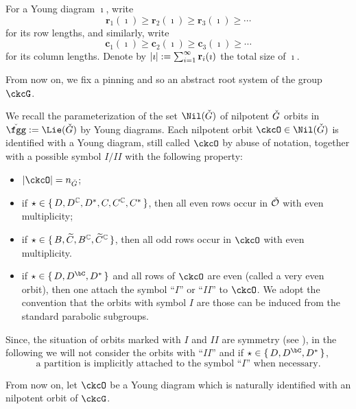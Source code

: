 \documentclass[counting_main.tex]{subfiles}
\begin{document}
For a Young diagram $\imath$, write
\[
  \mathbf r_1(\imath)\geq \mathbf r_2(\imath)\geq \mathbf r_3(\imath)\geq \cdots
\]
for its row lengths, and similarly, write
\[
  \mathbf c_1(\imath)\geq \mathbf c_2(\imath)\geq \mathbf c_3(\imath)\geq \cdots
\]
for its column lengths. Denote by
$\left|{\imath}\right|:=\sum_{i=1}^\infty \mathbf r_i(\imath)$ the total size of
$\imath$.

From now on, we fix a pinning and so an abstract root system of the group
$\ckcG$.


We recall the parameterization of the set $\Nil(\ckG)$ of nilpotent $\check{G}$
orbits in $\ckfgg:=\Lie(\ckG)$ by Young diagrams. Each nilpotent orbit
$\ckcO\in \Nil(\ckG)$ is identified with a Young diagram, still called $\ckcO$
by abuse of notation, together with a possible symbol $I/II$ with the following
property:
\begin{itemize}
  \item $\abs{\ckcO}=n_{\check G}$;
  \item if $\star\in\set{D, D^{\mathbb{C}}, D^*,C, C^{\mathbb{C}}, C^* } $, then all even rows occur
        in $\check {{\mathcal {O}}}$ with even multiplicity;
  \item if $\star\in \set{B, \widetilde C, B^{\mathbb{C}}, \widetilde C^{\mathbb{C}}}$, then all
        odd rows occur in $\ckcO$ with even multiplicity.
  \item if $\star\in \set{D,D^{\bC},D^{*}}$ and all rows of $\ckcO$ are even
  (called a very even orbit), then one attach the
        symbol ``$I$'' or ``$II$'' to $\ckcO$. We adopt the convention that the
        orbits with symbol $I$ are those can be induced from the standard
        parabolic subgroups.
\end{itemize}
Since, the situation of orbits marked with $I$ and $II$ are
symmetry (see ), in the following we will not consider the orbits with ``$II$'' and if
$\star\in \set{D,D^{\bC},D^{*}}$,
\[
  \text{ a partition is implicitly attached to the symbol ``$I$'' when
    necessary. }
\]


\smallskip

From now on, let $\ckcO$ be a Young diagram which is naturally identified with
an nilpotent orbit of $\ckcG$.
\end{document}
